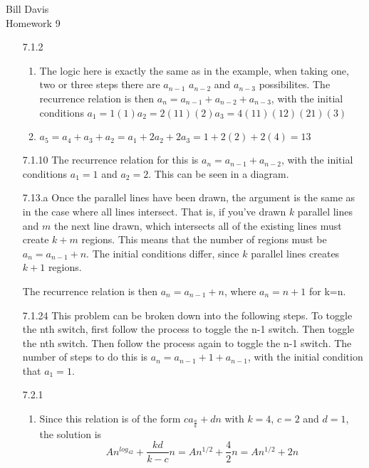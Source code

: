 \documentclass{article}
\begin{document}
Bill Davis\\
Homework 9

\begin{enumerate}
\item[7.1.2]
\begin{enumerate}
\item
The logic here is exactly the same as in the example, when taking one, two or three steps there are $a_{n-1}$ $a_{n-2}$ and $a_{n-3}$ possibilites. The recurrence relation is then $a_n=a_{n-1}+a_{n-2}+a_{n-3}$, with the initial conditions $a_1=1(1) a_2=2(11)(2) a_3=4(11)(12)(21)(3)$

\item
$a_5 = a_4+a_3+a_2 = a_1+2a_2+2a_3 = 1 + 2(2) + 2(4) = 13$

\end{enumerate}

\item[7.1.10]
The recurrence relation for this is $a_n=a_{n-1}+a_{n-2}$, with the initial conditions $a_1 = 1$ and $a_2=2$. This can be seen in a diagram. 

\vspace{30 mm}


\item[7.13.a]
Once the parallel lines have been drawn, the argument is the same as in the case where all lines intersect. That is, if you've drawn $k$ parallel lines and $m$ the next line drawn, which intersects all of the existing lines must create $k+m$ regions. This means that the number of regions must be $a_n=a_{n-1}+n$. The initial conditions differ, since $k$ parallel lines creates $k+1$ regions. 

The recurrence relation is then $a_n=a_{n-1}+n$, where $a_n=n+1$ for k=n. 

\item[7.1.24]
This problem can be broken down into the following steps. To toggle the nth switch, first follow the process to toggle the n-1 switch. Then toggle the nth switch. Then follow the process again to toggle the n-1 switch. The number of steps to do this is $a_n = a_{n-1} + 1 + a_{n-1}$, with the initial condition that $a_1 = 1$. 

\item[7.2.1]
\begin{enumerate}
\item
Since this relation is of the form $ca_{\frac{a}{k}}+dn$ with $k=4$, $c=2$ and $d=1$, the solution is 
\[
An^{log_42}+\frac{kd}{k-c}n = An^{1/2} + \frac{4}{2}n = An^{1/2}+2n
\]


\end{enumerate}
\end{enumerate}
\end{document}
